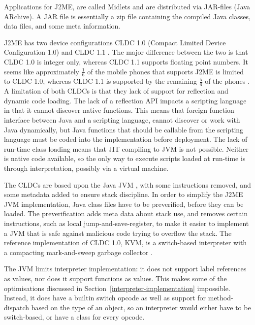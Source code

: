 \documentclass[11pt]{report}
\begin{document}
Applications for J2ME, are called Midlets and are distributed via JAR-files (Java ARchive). A JAR file is essentially a zip file containing the compiled Java classes, data files, and some meta information.

J2ME has two device configurations CLDC 1.0 (Compact Limited Device Configuration 1.0) \cite{cldc10}  and CLDC 1.1  \cite{cldc11}. The major difference between the two is that CLDC 1.0 is integer only, whereas CLDC 1.1 supports floating point numbers.
It seems like approximately $\frac{1}{6}$ of the mobile phones that supports J2ME is limited to CLDC 1.0, whereas CLDC 1.1 is supported by the remaining $\frac{5}{6}$ of the phones \cite{mobref}.
A limitation of both CLDCs is that they lack of support for reflection and dynamic code loading.
The lack of a reflection API impacts a scripting language in that it cannot discover native functions. This means that foreign function interface between Java and a scripting language, cannot discover or work with Java dynamically, but Java functions that should be callable from the scripting language must be coded into the implementation before deployment.
The lack of run-time class loading means that JIT compiling to JVM is not possible.
Neither is native code available, so the only way to execute scripts loaded at run-time is through interpretation, possibly via a virtual machine.

The CLDCs are based upon the Java JVM \cite{jvmref}, with some instructions removed, and some metadata added to ensure stack discipline. 
In order to simplify the J2ME JVM implementation, Java class files have to be preverified, before they can be loaded.
The preverification adds meta data about stack use, and removes certain instructions, such as local jump-and-save-register, to make it easier to implement a JVM that is safe against malicious code trying to overflow the stack.
The reference implementation of CLDC 1.0, KVM, is a switch-based interpreter with a compacting mark-and-sweep garbage collector \cite{kvm}.

The JVM limits interpreter implementation: it does not support label references as values, nor does it support functions as values. This makes some of the optimisations discussed in 
Section~\ref{interpreter-implementation} impossible.
Instead, it does have a builtin switch opcode as well as support for method-dispatch based on the type of an object, so an interpreter would either have to be switch-based, or have a class for every opcode.
\end{document}
